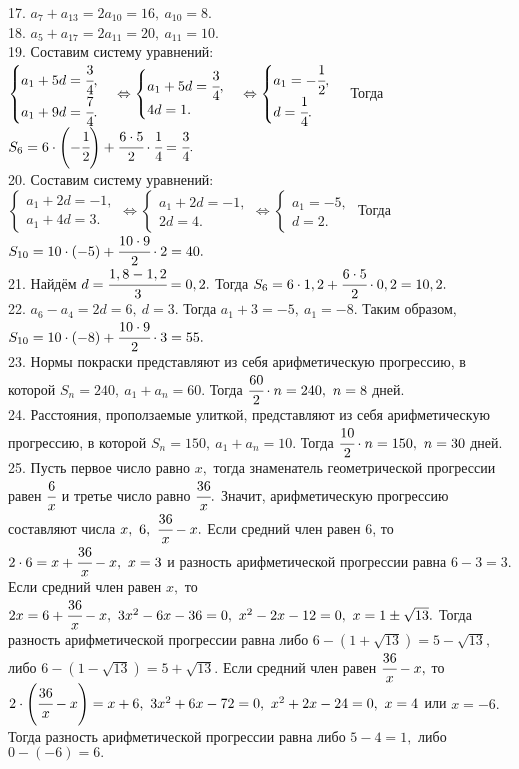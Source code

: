 17. $a_7+a_{13}=2a_{10}=16,\ a_{10}=8.$\\
18. $a_5+a_{17}=2a_{11}=20,\ a_{11}=10.$\\
19. Составим систему уравнений: $\begin{cases}a_1+5d=\cfrac{3}{4},\\a_1+9d=\cfrac{7}{4}.\end{cases}\Leftrightarrow\begin{cases}a_1+5d=\cfrac{3}{4},\\4d=1.\end{cases}
\Leftrightarrow\begin{cases}a_1=-\cfrac{1}{2},\\d=\cfrac{1}{4}.\end{cases}$ Тогда $S_6=6\cdot\left(-\cfrac{1}{2}\right)+\cfrac{6\cdot5}{2}\cdot\cfrac{1}{4}=\cfrac{3}{4}.$\\
20. Составим систему уравнений: $\begin{cases}a_1+2d=-1,\\a_1+4d=3.\end{cases}\Leftrightarrow\begin{cases}a_1+2d=-1,\\2d=4.\end{cases}
\Leftrightarrow\begin{cases}a_1=-5,\\d=2.\end{cases}$ Тогда $S_{10}=10\cdot\left(-5\right)+\cfrac{10\cdot9}{2}\cdot2=40.$\\
21. Найдём $d=\cfrac{1,8-1,2}{3}=0,2.$ Тогда $S_6=6\cdot1,2+\cfrac{6\cdot5}{2}\cdot0,2=10,2.$\\
22. $a_6-a_4=2d=6,\ d=3.$ Тогда $a_1+3=-5,\ a_1=-8.$ Таким образом, $S_{10}=10\cdot(-8)+\cfrac{10\cdot9}{2}\cdot3=55.$\\
23. Нормы покраски представляют из себя арифметическую прогрессию, в которой $S_n=240,\ a_1+a_n=60.$ Тогда $\cfrac{60}{2}\cdot n=240,\ n=8$ дней.\\
24. Расстояния, проползаемые улиткой, представляют из себя арифметическую прогрессию, в которой $S_n=150,\ a_1+a_n=10.$ Тогда $\cfrac{10}{2}\cdot n=150,\ n=30$ дней.\\
25. Пусть первое число равно $x,$ тогда знаменатель геометрической прогрессии равен $\cfrac{6}{x}$ и третье число равно $\cfrac{36}{x}.$ Значит, арифметическую прогрессию составляют числа $x,\ 6,\ \cfrac{36}{x}-x.$ Если средний член равен 6, то $2\cdot6=x+\cfrac{36}{x}-x,\ x=3$ и разность арифметической прогрессии равна $6-3=3.$ Если средний член равен $x,$ то $2x=6+\cfrac{36}{x}-x,\ 3x^2-6x-36=0,\ x^2-2x-12=0,\ x=1\pm\sqrt{13}.$ Тогда разность арифметической прогрессии равна либо $6-(1+\sqrt{13})=5-\sqrt{13},$ либо $6-(1-\sqrt{13})=5+\sqrt{13}.$ Если средний член равен $\cfrac{36}{x}-x,$ то $2\cdot\left(\cfrac{36}{x}-x\right)=x+6,\ 3x^2+6x-72=0,\ x^2+2x-24=0,\ x=4$ или $x=-6.$ Тогда разность арифметической прогрессии равна либо $5-4=1,$ либо $0-(-6)=6.$\\
